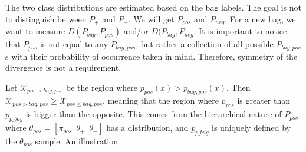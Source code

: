The two class distributions are estimated based on the bag labels. 
The goal is not to distinguish between $P_+$ and $P_-$.
We will get $P_{pos}$ and $P_{neg}$. 
For a new bag, we want to measure $D(P_{bag},P_{pos})$ and/or $D(P_{bag},P_{neg}$.
It is important to notice that $P_{pos}$ is not equal to any $P_{bag, pos}$, but rather a collection of all possible $P_{bag,pos}$s with their probability of occurrence taken in mind.
Therefore, symmetry of the divergence is not a requirement.

Let $\mathcal{X}_{pos>{bag,pos}}$ be the region where $p_{pos}(x)>p_{bag,pos}(x)$. 
Then $\mathcal{X}_{pos>{bag,pos}} \geq \mathcal{X}_{pos \leq {bag,pos}}$, 
meaning that the region where $p_{pos}$ is greater than $p_{p\_ bag}$ is bigger than the opposite. 
This comes from the hierarchical nature of $P_{pos}$, where $\theta_{pos} = [\pi_{pos} \,\,\,\theta_+ \,\,\,\theta_-]$ has a distribution, and $p_{p\_ bag}$ is uniquely defined by the $\theta_{pos}$ sample. 
An illustration

